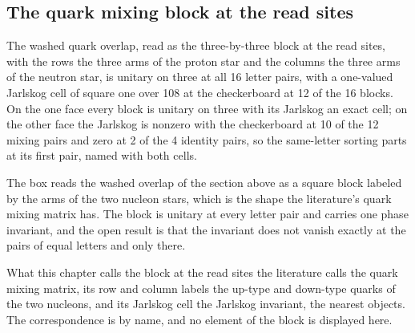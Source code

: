 \subsection{The quark mixing block at the read sites}\label{mod:VI-7-D538947-w-ckmb}
\begin{chwall}\label{box:VI-7-D538947-w-ckmb:1}
The washed quark overlap, read as the three-by-three block at the read sites, with the rows the three arms of the proton star and the columns the three arms of the neutron star, is unitary on three at all 16 letter pairs, with a one-valued Jarlskog cell of square one over 108 at the checkerboard at 12 of the 16 blocks. On the one face every block is unitary on three with its Jarlskog an exact cell; on the other face the Jarlskog is nonzero with the checkerboard at 10 of the 12 mixing pairs and zero at 2 of the 4 identity pairs, so the same-letter sorting parts at its first pair, named with both cells.
\end{chwall}
The box reads the washed overlap of the section above as a square block labeled by the arms of the two nucleon stars, which is the shape the literature's quark mixing matrix has. The block is unitary at every letter pair and carries one phase invariant, and the open result is that the invariant does not vanish exactly at the pairs of equal letters and only there.
\begin{chbridge}
What this chapter calls the block at the read sites the literature calls the quark mixing matrix, its row and column labels the up-type and down-type quarks of the two nucleons, and its Jarlskog cell the Jarlskog invariant, the nearest objects. The correspondence is by name, and no element of the block is displayed here.
\end{chbridge}
